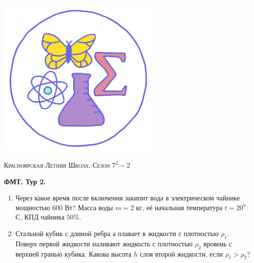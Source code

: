 \colorbox{white!10!}{
    \begin{minipage}{0.2\textwidth}
       \begin{flushleft}
        \includegraphics[width = 0.6\textwidth]{Эмблема.png}
       \end{flushleft}
    \end{minipage}
    \begin{minipage}[t]{0.7 \textwidth}
        \begin{center}
            {\huge \textsc{Красноярская Летняя Школа. Сезон $7^2 - 2$}}
            \vspace{0.25cm}
            
            { \huge \textbf{ФМТ. Тур 2.}}
        \end{center}
        \vspace{0.05cm}
    \end{minipage}
}

\begin{enumerate}
    \item Через какое время после включения закипит вода в электрическом чайнике мощностью 600 Вт? Масса воды $m = 2$ кг, её начальная температура $t = 20^{o}$ С, КПД чайника $50 \%$.
	\item Стальной кубик с длиной ребра $а$ плавает в жидкости с плотностью $\rho_1$. Поверх первой жидкости наливают жидкость с плотностью $\rho_2$ вровень с верхней гранью кубика. Какова высота $h$ слоя второй жидкости, если $\rho_1>\rho_2$?

\end{enumerate}